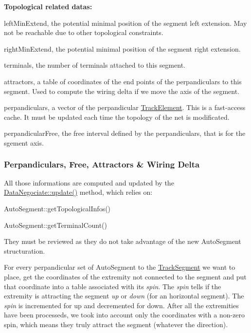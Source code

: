 {\bfseries Topological related datas\+:}
\begin{DoxyItemize}
\item {\ttfamily left\+Min\+Extend}, the potential minimal position of the segment left extension. May not be reachable due to other topological constraints.
\item {\ttfamily right\+Min\+Extend}, the potential minimal position of the segment right extension.
\item {\ttfamily terminals}, the number of terminals attached to this segment.
\item {\ttfamily attractors}, a table of coordinates of the end points of the perpandiculars to this segment. Used to compute the wiring delta if we move the axis of the segment.
\item {\ttfamily perpandiculars}, a {\ttfamily vector} of the perpandicular \hyperlink{classKite_1_1TrackElement}{Track\+Element}. This is a fast-\/access cache. It must be updated each time the topology of the net is modificated.
\item {\ttfamily perpandicular\+Free}, the free interval defined by the perpandiculars, that is for the sgement axis.
\end{DoxyItemize}\hypertarget{classKite_1_1DataNegociate_secAttractorsComputation}{}\subsubsection{Perpandiculars, Free, Attractors \& Wiring Delta}\label{classKite_1_1DataNegociate_secAttractorsComputation}
All those informations are computed and updated by the \hyperlink{classKite_1_1DataNegociate_ac5c54df7ed3b930268c8d7752c101725}{Data\+Negociate\+::update()} method, which relies on\+:
\begin{DoxyItemize}
\item Auto\+Segment\+::get\+Topological\+Infos()
\item Auto\+Segment\+::get\+Terminal\+Count()
\end{DoxyItemize}

They must be reviewed as they do not take advantage of the new Auto\+Segment structuration.

For every perpandicular set of Auto\+Segment to the \hyperlink{classKite_1_1TrackSegment}{Track\+Segment} we want to place, get the coordinates of the extremity not connected to the segment and put that coordinate into a table associated with it\textquotesingle{}s {\itshape spin}. The {\itshape spin} tells if the extremity is attracting the segment {\itshape up} or {\itshape down} (for an horizontal segment). The {\itshape spin} is incremented for up and decremented for down. After all the extremities have been processeds, we took into account only the coordinates with a non-\/zero spin, which means they truly attract the segment (whatever the direction).

